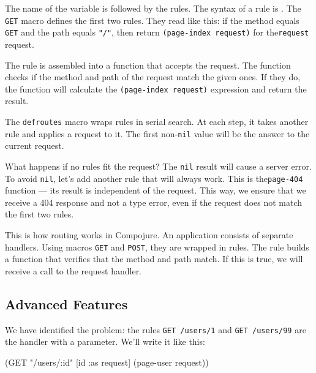 The name of the variable is followed by the rules. The syntax of a rule is .
The \verb|GET| macro defines the first two rules. They read like this:
if the method equals \verb|GET| and the path equals \verb|"/"|, then return \verb|(page-index request)| for the\verb|request| request.


The rule is assembled into a function that accepts the request. The function checks if the method and path of the request match the given ones. If they do, the function will calculate the \verb|(page-index request)| expression and return the result.

The \verb|defroutes| macro wraps rules in serial search. At each step, it takes another rule and applies a request to it. The first non-\verb|nil| value will be the answer to the current request.

What happens if no rules fit the request? The \verb|nil| result will cause a server error. To avoid \verb|nil|, let's add another rule that will always work. This is the\verb|page-404| function — its result is independent of the request. This way, we ensure that we receive a 404 response and not a type error, even if the request does not match the first two rules.

This is how routing works in Compojure. An application consists of separate handlers. Using macros \verb|GET| and \verb|POST|, they are wrapped in rules. The rule builds a function that verifies that the method and path match. If this is true, we will receive a call to the request handler.

\subsection{Advanced Features}

We have identified the problem: the rules \verb|GET /users/1| and \verb|GET /users/99| are the handler with a parameter. We'll write it like this:


\ifx\DEVICETYPE\MOBILE

\begin{english}
  \begin{clojure}
(GET "/users/:id" [id :as request]
    (page-user request))
  \end{clojure}
\end{english}

\else

